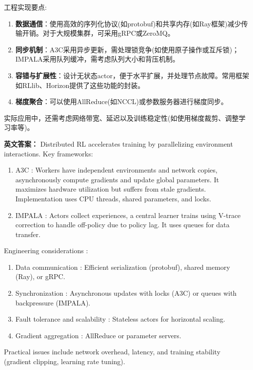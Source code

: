 \documentclass[10pt,a4paper]{ctexart}
\begin{document}
 工程实现要点:
\begin{enumerate}
    \item \textbf{数据通信}：使用高效的序列化协议(如protobuf)和共享内存(如Ray框架)减少传输开销。对于大规模集群，可采用gRPC或ZeroMQ。
    \item \textbf{同步机制}：A3C采用异步更新，需处理锁竞争(如使用原子操作或互斥锁)；IMPALA采用队列缓冲，需考虑队列大小和背压机制。
    \item \textbf{容错与扩展性}：设计无状态actor，便于水平扩展，并处理节点故障。常用框架如RLlib、Horizon提供了这些功能的封装。
    \item \textbf{梯度聚合}：可以使用AllReduce(如NCCL)或参数服务器进行梯度同步。
\end{enumerate}

实际应用中，还需考虑网络带宽、延迟以及训练稳定性(如使用梯度裁剪、调整学习率等)。

\textbf{英文答案：}  
Distributed RL accelerates training by parallelizing environment interactions. Key frameworks:

\begin{enumerate}
    \item A3C : Workers have independent environments and network copies, asynchronously compute gradients and update global parameters. It maximizes hardware utilization but suffers from stale gradients. Implementation uses CPU threads, shared parameters, and locks.

    \item IMPALA : Actors collect experiences, a central learner trains using V-trace correction to handle off-policy due to policy lag. It uses queues for data transfer.
\end{enumerate}

 Engineering considerations :
\begin{enumerate}
    \item Data communication : Efficient serialization (protobuf), shared memory (Ray), or gRPC.
    \item Synchronization : Asynchronous updates with locks (A3C) or queues with backpressure (IMPALA).
    \item Fault tolerance and scalability : Stateless actors for horizontal scaling.
    \item Gradient aggregation : AllReduce or parameter servers.
\end{enumerate}

Practical issues include network overhead, latency, and training stability (gradient clipping, learning rate tuning).
\end{document}
